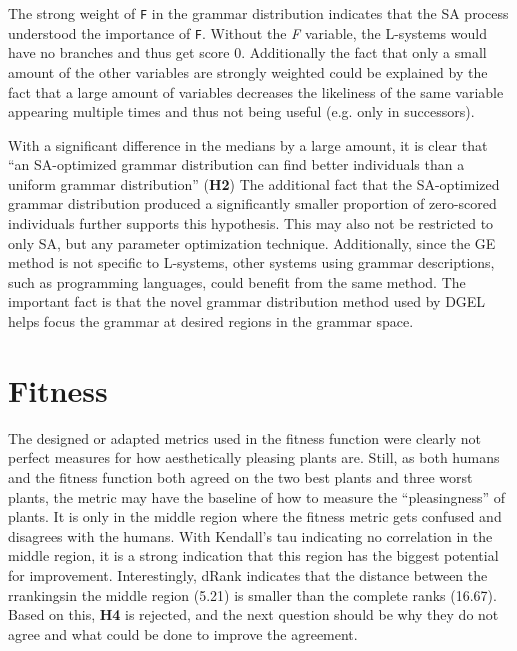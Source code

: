 The strong weight of \texttt{F} in the grammar distribution indicates that the SA process understood the importance of \texttt{F}.
Without the \textit{F} variable, the L-systems would have no branches and thus get score 0.
Additionally the fact that only a small amount of the other variables are strongly weighted could be explained by the fact that a large amount of variables decreases the likeliness of the same variable appearing multiple times and thus not being useful (e.g. only in successors).

With a significant difference in the medians by a large amount, it is clear that ``an SA-optimized grammar distribution can find better individuals than a uniform grammar distribution'' (\textbf{H2})
The additional fact that the SA-optimized grammar distribution produced a significantly smaller proportion of zero-scored individuals further supports this hypothesis.
This may also not be restricted to only SA, but any parameter optimization technique.
Additionally, since the GE method is not specific to L-systems, other systems using grammar descriptions, such as programming languages, could benefit from the same method.
The important fact is that the novel grammar distribution method used by DGEL helps focus the grammar at desired regions in the grammar space.


\section{Fitness}
The designed or adapted metrics used in the fitness function were clearly not perfect measures for how aesthetically pleasing plants are.
Still, as both humans and the fitness function both agreed on the two best plants and three worst plants, the metric may have the baseline of how to measure the ``pleasingness'' of plants.
It is only in the middle region where the fitness metric gets confused and disagrees with the humans.
With Kendall's tau indicating no correlation in the middle region, it is a strong indication that this region has the biggest potential for improvement.
Interestingly, dRank indicates that the distance between the rrankingsin the middle region (5.21) is smaller than the complete ranks (16.67). %
Based on this, \textbf{H4} is rejected, and the next question should be why they do not agree and what could be done to improve the agreement.

